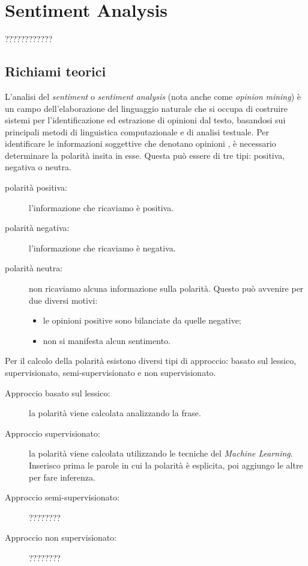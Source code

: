 \chapter{Sentiment Analysis}
	????????????
	
	\section{Richiami teorici}
		L'analisi del \textit{sentiment} o \textit{sentiment} \textit{analysis} (nota anche come \textit{opinion} \textit{mining}) è un campo dell'elaborazione del linguaggio naturale che si occupa di costruire sistemi per l'identificazione ed estrazione di opinioni dal testo, basandosi sui principali metodi di linguistica computazionale e di analisi testuale. Per identificare le informazioni soggettive che denotano opinioni , è necessario determinare la polarità insita in esse. Questa può essere di tre tipi: positiva, negativa o neutra.
		
		\begin{description}
			\item [polarità positiva:] l'informazione che ricaviamo è positiva.
			\item [polarità negativa:] l'informazione che ricaviamo è negativa.
			\item [polarità neutra:] non ricaviamo alcuna informazione sulla polarità. Questo può avvenire per due diversi motivi:
			
			\begin{itemize}
				\item le opinioni positive sono bilanciate da quelle negative;
				\item non si manifesta alcun sentimento.
			\end{itemize}
			
		\end{description}
	
		Per il calcolo della polarità esistono diversi tipi di approccio: basato sul lessico, supervisionato, semi-supervisionato e non supervisionato.
		
		\begin{description}
			\item [Approccio basato sul lessico:] la polarità viene calcolata analizzando la frase.
			\item [Approccio supervisionato:] la polarità viene calcolata utilizzando le tecniche del \textit{Machine Learning}. Inserisco prima le parole in cui la polarità è esplicita, poi aggiungo le altre per fare inferenza.
			\item [Approccio semi-supervisionato:] ????????
			\item [Approccio non supervisionato:] ????????	
		\end{description}
		
